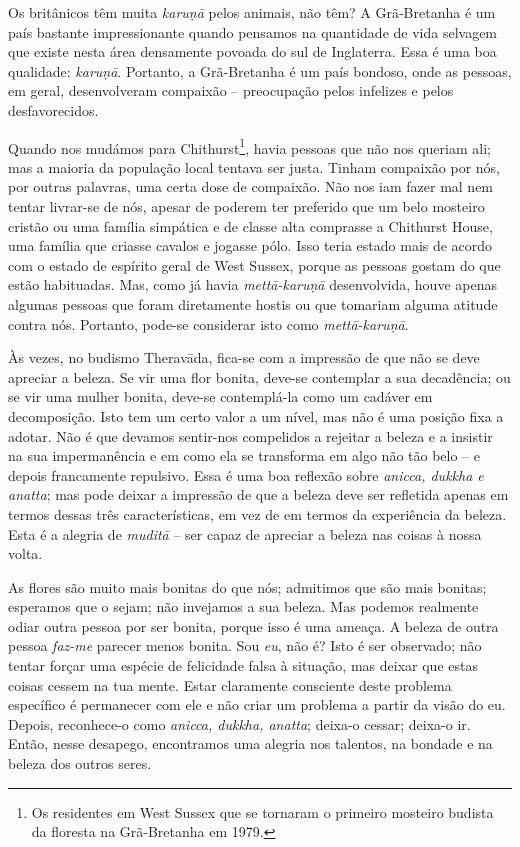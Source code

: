 Os britânicos têm muita \emph{karuṇā} pelos animais, não têm? A Grã-Bretanha é
um país bastante impressionante quando pensamos na quantidade de vida selvagem
que existe nesta área densamente povoada do sul de Inglaterra. Essa é uma boa
qualidade: \emph{karuṇā}. Portanto, a Grã-Bretanha é um país bondoso, onde as
pessoas, em geral, desenvolveram compaixão -- preocupação pelos infelizes e
pelos desfavorecidos.

Quando nos mudámos para Chithurst\footnote{Os residentes em West Sussex que se
  tornaram o primeiro mosteiro budista da floresta na Grã-Bretanha em 1979.},
havia pessoas que não nos queriam ali; mas a maioria da população local tentava
ser justa. Tinham compaixão por nós, por outras palavras, uma certa dose de
compaixão. Não nos iam fazer mal nem tentar livrar-se de nós, apesar de poderem
ter preferido que um belo mosteiro cristão ou uma família simpática e de classe
alta comprasse a Chithurst House, uma família que criasse cavalos e jogasse
pólo. Isso teria estado mais de acordo com o estado de espírito geral de West
Sussex, porque as pessoas gostam do que estão habituadas. Mas, como já havia
\emph{mettā-karuṇā} desenvolvida, houve apenas algumas pessoas que foram
diretamente hostis ou que tomariam alguma atitude contra nós. Portanto, pode-se
considerar isto como \emph{mettā-karuṇā}.

Às vezes, no budismo Theravāda, fica-se com a impressão de que não se deve
apreciar a beleza. Se vir uma flor bonita, deve-se contemplar a sua decadência;
ou se vir uma mulher bonita, deve-se contemplá-la como um cadáver em
decomposição. Isto tem um certo valor a um nível, mas não é uma posição fixa a
adotar. Não é que devamos sentir-nos compelidos a rejeitar a beleza e a
insistir na sua impermanência e em como ela se transforma em algo não tão belo
-- e depois francamente repulsivo. Essa é uma boa reflexão sobre \emph{anicca,
  dukkha e anatta}; mas pode deixar a impressão de que a beleza deve ser
refletida apenas em termos dessas três características, em vez de em termos da
experiência da beleza. Esta é a alegria de \emph{muditā} -- ser capaz de
apreciar a beleza nas coisas à nossa volta.

As flores são muito mais bonitas do que nós; admitimos que são mais bonitas;
esperamos que o sejam; não invejamos a sua beleza. Mas podemos realmente odiar
outra pessoa por ser bonita, porque isso é uma ameaça. A beleza de outra pessoa
\emph{faz-me} parecer menos bonita. Sou \emph{eu}, não é? Isto é ser observado;
não tentar forçar uma espécie de felicidade falsa à situação, mas deixar que
estas coisas cessem na tua mente. Estar claramente consciente deste problema
específico é permanecer com ele e não criar um problema a partir da visão do eu.
Depois, reconhece-o como \emph{anicca, dukkha, anatta}; deixa-o cessar;
deixa-o ir. Então, nesse desapego, encontramos uma alegria nos talentos, na
bondade e na beleza dos outros seres.

